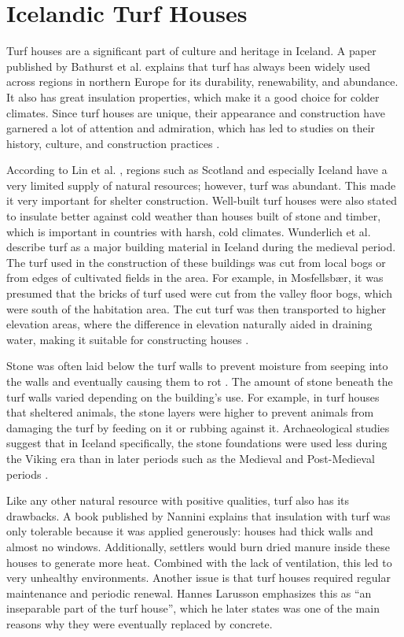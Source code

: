 \section{Icelandic Turf Houses}

Turf houses are a significant part of culture and heritage in Iceland. A
paper published by Bathurst et al. \cite{ref01} explains that turf has
always been widely used across regions in northern Europe for its
durability, renewability, and abundance. It also has great
insulation properties, which make it a good choice for colder climates.
Since turf houses are unique, their appearance and construction have
garnered a lot of attention and admiration, which has led to studies on
their history, culture, and construction practices \cite{ref05}.

According to Lin et al. \cite{ref02}, regions such as Scotland and especially
Iceland have a very limited supply of natural resources; however, turf was
abundant. This made it very important for shelter construction. Well-built
turf houses were also stated to insulate better against cold weather than
houses built of stone and timber, which is important in countries with
harsh, cold climates. Wunderlich et al.
\cite{ref03} describe turf as a major building material in Iceland
during the medieval period. The turf used in the construction of these
buildings was cut from local bogs or from edges of cultivated fields in
the area. For example, in Mosfellsbær, it was presumed that the bricks
of turf used were cut from the valley floor bogs, which were south of the
habitation area. The cut turf was then transported to higher elevation
areas, where the difference in elevation naturally aided in draining
water, making it suitable for constructing houses \cite{ref01}.

Stone was often laid below the turf walls to prevent moisture from
seeping into the walls and eventually causing them to rot \cite{ref04}. The
amount of stone beneath the turf walls varied depending on the building's use.
For example, in turf houses that sheltered animals, the stone layers were
higher to prevent animals from damaging the turf by feeding on it or
rubbing against it. Archaeological studies suggest that in Iceland
specifically, the stone foundations were used less during the Viking era
than in later periods such as the Medieval and Post-Medieval periods \cite{ref03}.

Like any other natural resource with positive qualities, turf also has
its drawbacks. A book published by Nannini \cite{ref05} explains that
insulation with turf was only tolerable because it was applied generously:
houses had thick walls and almost no windows.
Additionally, settlers would burn dried manure inside these houses to
generate more heat. Combined with the lack of ventilation, this led to
very unhealthy environments. Another issue is that turf houses required regular maintenance and periodic renewal.
Hannes Larusson \cite{ref06} emphasizes this as ``an inseparable part of the turf
house'', which he later states was one of the main reasons why they were
eventually replaced by concrete.

